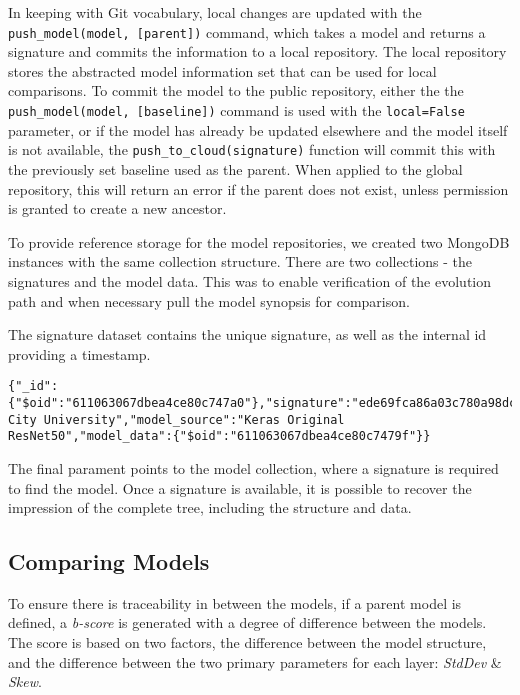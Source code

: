 In keeping with Git vocabulary, local changes are updated with the \verb|push_model(model, [parent])| command, which takes a model and returns a signature and commits the information to a local repository. The local repository stores the abstracted model information set that can be used for local comparisons.
To commit the model to the public repository, either the the \verb|push_model(model, [baseline])| command is used with the \verb|local=False| parameter, or if the model has already be updated elsewhere and the model itself is not available, the \verb|push_to_cloud(signature)| function will commit this with the previously set baseline used as the parent. When applied to the global repository, this will return an error if the parent does not exist, unless permission is granted to create a new ancestor.

To provide reference storage for the model repositories, we created two MongoDB instances with the same collection structure. There are two collections - the signatures and the model data. This was to enable verification of the evolution path and when necessary pull the model synopsis for comparison.

The signature dataset contains the unique signature, as well as the internal id providing a timestamp. 

\begin{lstlisting}
{"_id":{"$oid":"611063067dbea4ce80c747a0"},"signature":"ede69fca86a03c780a98dcec6fc1cfe406a3448dcba95663baa18bf853bc2f0f","parent":null,"username":"brendan.bonner2@mail.dcu.ie","organisation":"Dublin City University","model_source":"Keras Original ResNet50","model_data":{"$oid":"611063067dbea4ce80c7479f"}}
\end{lstlisting}

The final parament points to the model collection, where a signature is required to find the model. Once a signature is available, it is possible to recover the impression of the complete tree, including the structure and data.

\subsection{Comparing Models}
To ensure there is traceability in between the models, if a parent model is defined, a \textit{b-score} is generated with a degree of difference between the models. The score is based on two factors, the difference between the model structure, and the difference between the two primary parameters for each layer: \textit{StdDev} \& \textit{Skew}. 

